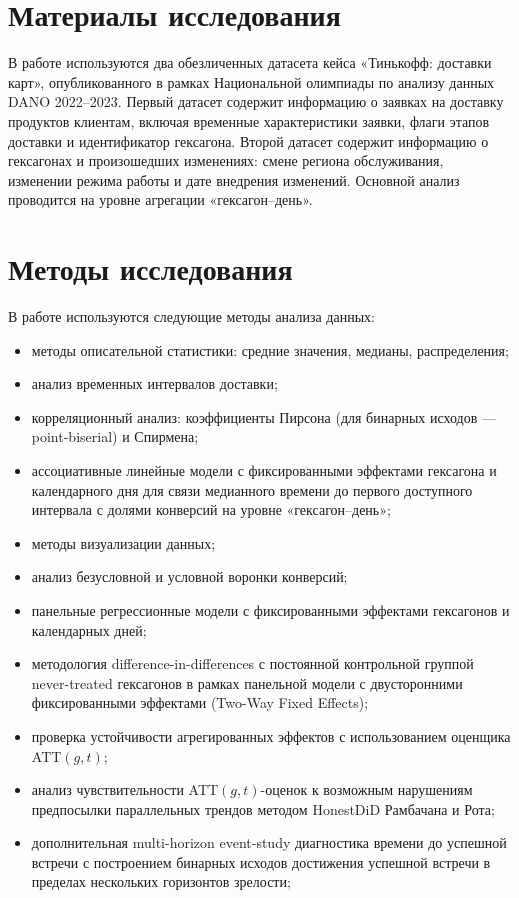 \documentclass[14pt,a4paper]{extarticle}
\begin{document}
\section{Материалы исследования}

В работе используются два обезличенных датасета кейса «Тинькофф: доставки карт», опубликованного в рамках Национальной олимпиады по анализу данных DANO 2022–2023. Первый датасет содержит информацию о заявках на доставку продуктов клиентам, включая временные характеристики заявки, флаги этапов доставки и идентификатор гексагона. Второй датасет содержит информацию о гексагонах и произошедших изменениях: смене региона обслуживания, изменении режима работы и дате внедрения изменений. Основной анализ проводится на уровне агрегации «гексагон--день».

\section{Методы исследования}

В работе используются следующие методы анализа данных:
\begin{itemize}
    \item методы описательной статистики: средние значения, медианы, распределения;
    \item анализ временных интервалов доставки;
    \item корреляционный анализ: коэффициенты Пирсона (для бинарных исходов --- point-biserial) и Спирмена;
    \item ассоциативные линейные модели с фиксированными эффектами гексагона и календарного дня для связи медианного времени до первого доступного интервала с долями конверсий на уровне «гексагон--день»;
    \item методы визуализации данных;
    \item анализ безусловной и условной воронки конверсий;
    \item панельные регрессионные модели с фиксированными эффектами гексагонов и календарных дней;
    \item методология difference-in-differences с постоянной контрольной группой never-treated гексагонов в рамках панельной модели с двусторонними фиксированными эффектами (Two-Way Fixed Effects);
    \item проверка устойчивости агрегированных эффектов с использованием оценщика ATT\((g,t)\);
    \item анализ чувствительности ATT\((g,t)\)-оценок к возможным нарушениям предпосылки параллельных трендов методом HonestDiD Рамбачана и Рота;
    \item дополнительная multi-horizon event-study диагностика времени до успешной встречи с построением бинарных исходов достижения успешной встречи в пределах нескольких горизонтов зрелости;
\end{itemize}
\end{document}
